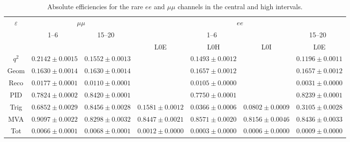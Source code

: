\begin{landscape}

\begin{table}
\centering
\caption{Absolute efficiencies for the rare $ee$ and $\mu\mu$ channels in the central and high \qsq intervals.}
\begin{tabular}{|c|c|c|c|c|c|c|}
\hline \multirow{3}{*}{$\varepsilon$} 			&  \multicolumn {2}{c|}{$\mu\mu$} 				& \multicolumn {4}{c|}{$ee$} \\ \cline{2-7}
			 & 1--6~\gevgevcccc				& 15--20~\gevgevcccc  				& \multicolumn {3}{c|}{1--6~\gevgevcccc} 				& \multicolumn {1}{c|}{15--20~\gevgevcccc }\\ \cline{2-7}
				&  \multicolumn {2}{c|}{} &  L0E 	& L0H 	& L0I 	& L0E 	\\ \hline
$q^2$  & $ 0.2142  \pm  0.0015 $ & $ 0.1552  \pm  0.0013 $ &  \multicolumn{3}{c|}{$ 0.1493  \pm  0.0012 $} & \multicolumn{1}{c|}{$ 0.1196  \pm  0.0011 $} \\
Geom  & $ 0.1630  \pm  0.0014 $ & $ 0.1630  \pm  0.0014 $ &  \multicolumn{3}{c|}{$ 0.1657  \pm  0.0012 $} & \multicolumn{1}{c|}{$ 0.1657  \pm  0.0012 $} \\
Reco  & $ 0.0177  \pm  0.0001 $ & $ 0.0110  \pm  0.0001 $ &  \multicolumn{3}{c|}{$ 0.0105  \pm  0.0000 $} & \multicolumn{1}{c|}{$ 0.0031  \pm  0.0000 $} \\
PID  & $ 0.7824  \pm  0.0002 $ & $ 0.8420  \pm  0.0001 $ &  \multicolumn{3}{c|}{$ 0.7750  \pm  0.0001 $} & \multicolumn{1}{c|}{$ 0.8239  \pm  0.0001 $} \\
\hline
Trig  & $ 0.6852  \pm  0.0029 $ & $ 0.8456  \pm  0.0028 $ & $ 0.1581  \pm  0.0012 $ & $ 0.0366  \pm  0.0006 $ & $ 0.0802  \pm  0.0009 $ & $ 0.3105  \pm  0.0028 $  \\
MVA  & $ 0.9097  \pm  0.0022 $ & $ 0.8298  \pm  0.0032 $ & $ 0.8447  \pm  0.0021 $ & $ 0.8571  \pm  0.0020 $ & $ 0.8156  \pm  0.0046 $ & $ 0.8436  \pm  0.0033 $  \\
\hline
Tot  & $ 0.0066  \pm  0.0001 $ & $ 0.0068  \pm  0.0001 $ & $ 0.0012  \pm  0.0000 $ & $ 0.0003  \pm  0.0000 $ & $ 0.0006  \pm  0.0000 $ & $ 0.0009  \pm  0.0000 $  \\
\hline
\end{tabular}
\label{tab:RKst_AbsEff}
\end{table}



\end{landscape}
